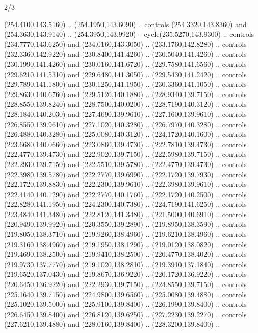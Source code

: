 \begin{flagdescription}{2/3}
\begin{scope}[xshift=0.5\flaglength,yshift=0.5\flagwidth,scale=\flagwidth/259.2]
\begin{scope}[y=0.8pt, x=0.8pt, yscale=-1,shift={(-243,-162)}]
      (254.4100,143.5160) .. (254.1950,143.6090) .. controls (254.3320,143.8360) and
      (254.3630,143.9140) .. (254.3950,143.9920) -- cycle(235.5270,143.9300) ..
      controls (234.7770,143.6250) and (234.0160,143.3050) .. (233.1760,142.8280) ..
      controls (232.3360,142.9220) and (230.8400,141.4260) .. (230.5040,141.4260) ..
      controls (230.1990,141.4260) and (230.0160,141.6720) .. (229.7580,141.6560) ..
      controls (229.6210,141.5310) and (229.6480,141.3050) .. (229.5430,141.2420) ..
      controls (229.7890,141.1800) and (230.1250,141.1950) .. (230.3360,141.1050) ..
      controls (229.8630,140.6760) and (229.5120,140.1880) .. (228.9340,139.7150) ..
      controls (228.8550,139.8240) and (228.7500,140.0200) .. (228.7190,140.3120) ..
      controls (228.1840,140.2030) and (227.4690,139.9610) .. (227.1600,139.9610) ..
      controls (226.8550,139.9610) and (227.1020,140.3280) .. (226.7970,140.3280) ..
      controls (226.4880,140.3280) and (225.0080,140.3120) .. (224.1720,140.1600) ..
      controls (223.6680,140.0660) and (223.0860,139.4730) .. (222.7810,139.4730) ..
      controls (222.4770,139.4730) and (222.9020,139.7150) .. (222.5980,139.7150) ..
      controls (222.2930,139.7150) and (222.5510,139.5780) .. (222.4770,139.4730) ..
      controls (222.3980,139.5780) and (222.2770,139.6990) .. (222.1720,139.7930) ..
      controls (222.1720,139.8830) and (222.2300,139.9610) .. (222.3980,139.9610) ..
      controls (222.4140,140.1290) and (222.2770,140.1760) .. (222.1720,140.2500) ..
      controls (222.8280,141.1950) and (224.2300,140.7380) .. (224.7190,141.6250) ..
      controls (223.4840,141.3480) and (222.8120,141.3480) .. (221.5000,140.6910) ..
      controls (220.9490,139.9920) and (220.3550,139.2890) .. (219.8950,138.3590) ..
      controls (219.8050,138.3710) and (219.9260,138.4960) .. (219.6210,138.4960) ..
      controls (219.3160,138.4960) and (219.1950,138.1290) .. (219.0120,138.0820) ..
      controls (219.4690,138.2500) and (219.9410,138.2500) .. (220.4770,138.4020) ..
      controls (219.9730,137.7770) and (219.1020,138.2810) .. (219.3910,137.1840) ..
      controls (219.6520,137.0430) and (219.8670,136.9220) .. (220.1720,136.9220) ..
      controls (220.6450,136.9220) and (222.2930,139.7150) .. (224.8550,139.7150) ..
      controls (225.1640,139.7150) and (224.9800,139.6560) .. (225.0080,139.4880) ..
      controls (225.1020,139.5000) and (225.9100,139.8400) .. (226.1990,139.8400) ..
      controls (226.6450,139.8400) and (226.8120,139.6250) .. (227.2230,139.2270) ..
      controls (227.6210,139.4880) and (228.0160,139.8400) .. (228.3200,139.8400) ..

\end{scope}
\end{scope}
\end{flagdescription}
